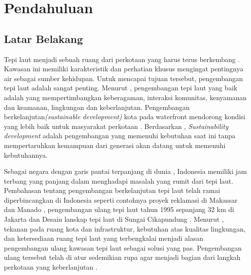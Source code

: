 \documentclass[../projects/thesis.tex]{subfiles}
\begin{document}
\chapter{Pendahuluan}\label{chap:pendahuluan}

\section{Latar Belakang}
Tepi laut menjadi sebuah ruang dari perkotaan yang harus terus berkembang \cite{shamsuddin2013}. Kawasan ini memiliki karakteristik dan perhatian khusus mengingat pentingnya air sebagai sumber kehidupan. Untuk mencapai tujuan tersebut, pengembangan tepi laut adalah sangat penting. Menurut \cite{hussein2014}, pengembangan tepi laut yang baik adalah yang mempertimbangkan keberagaman, interaksi komunitas, kenyamanan dan keamanan, lingkungan dan keberlanjutan. Pengembangan berkelanjutan\textit{(sustainable development)} kota pada waterfront mendorong kondisi yang lebih baik untuk masyarakat perkotaan \citep{brebbia2016sustainable}.
Berdasarkan \cite{imperatives1987}, \textit{Sustainability development} adalah pengembangan yang memenuhi kebutuhan saat ini tanpa mempertaruhkan kemampuan dari generasi akan datang untuk memenuhi kebutuhannya.

Sebagai negara dengan garis pantai terpanjang di dunia \citep{hindersah2015}, Indonesia memiliki jam terbang yang panjang dalam menghadapi masalah yang rumit dari tepi laut. Pembahasan tentang pengembangan berkelanjutan tepi laut telah ramai diperbincangkan di Indonesia seperti contohnya proyek reklamasi di Makassar dan Manado \citep{andi2017,tungka2012, fhuh2017}, pengembangan ulang tepi laut tahun 1995 sepanjang 32 km di Jakarta \citep{pramesti2017} dan Desain lanskap tepi laut di Sungai Cikapundung \citep{ainy2016}. Menurut \cite{breen1994}, tekanan pada ruang kota dan infrastruktur, kebutuhan atas kualitas lingkungan, dan ketersediaan ruang tepi laut yang terbengkalai menjadi alasan pengembangan ulang kawasan tepi laut sebagai solusi yang pas. Pengembangan ulang tersebut telah di atur sedemikian rupa agar menjadi bagian dari langkah perkotaan yang keberlanjutan \citep{pramesti2017}.
\end{document}
